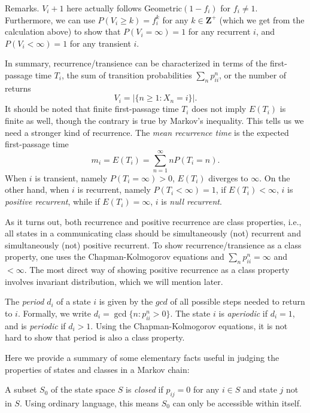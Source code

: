 \documentclass[11pt]{article}
\newcommand{\Z}{\mathbf{Z}}
\newcommand{\abs}[1]{\lvert #1 \rvert}
\begin{document}
\noindent Remarks. $V_{i}+1$ here actually follows Geometric$(1- f_{i})$ for $f_{i}\neq 1$. Furthermore, we can use $P(V_{i}\geq k)=f_{i}^{k}$ for any $k\in \Z^+$ (which we get from the calculation above) to show that $P(V_{i}=\infty )=1$ for any recurrent $i$, and $P(V_{i}<\infty )=1$ for any transient $i$.

In summary, recurrence/transience can be characterized in terms of the first-passage time $T_{i}$, the sum of transition probabilities $\sum_{n}p_{ii}^{n}$, or the number of returns 
\[
V_{i}=\abs{\{n\geq 1:X_{n}=i\}}.
\]
It should be noted that finite first-passage time $T_{i}$ does not imply $E(T_{i})$ is finite as well, though the contrary is true by Markov’s inequality. This tells us we need a stronger kind of recurrence. The \textit{mean recurrence time} is the expected first-passage time
\[
m_{i}=E(T_{i})=\sum_{n=1}^{\infty }nP(T_{i}=n).
\]
When $i$ is transient, namely $P(T_{i}=\infty )>0$, $E(T_{i})$ diverges to $\infty $. On the other hand, when $i$ is recurrent, namely $P(T_{i}<\infty )=1$, if $E(T_{i})<\infty $, $i$ is \textit{positive recurrent}, while if $E(T_{i})=\infty $, $i$ is \textit{null recurrent}.

As it turns out, both recurrence and positive recurrence are class properties, i.e., all states in a communicating class should be simultaneously (not) recurrent and simultaneously (not) positive recurrent. To show recurrence/transience as a class property, one uses the Chapman-Kolmogorov equations and $\sum_{n}p_{ii}^{n}=\infty $ and $<\infty $. The most direct way of showing positive recurrence as a class property involves invariant distribution, which we will mention later.

The \textit{period} $d_{i}$ of a state $i$ is given by the $gcd$ of all possible steps needed to return to $i$. Formally, we write $d_{i}=\gcd\{n:p_{ii}^{n}>0\}$. The state $i$ is \textit{aperiodic} if $d_{i}=1$, and is \textit{periodic} if $d_{i}>1$. Using the Chapman-Kolmogorov equations, it is not hard to show that period is also a class property.

Here we provide a summary of some elementary facts useful in judging the properties of states and classes in a Markov chain:

A subset $S_{0}$ of the state space $S$ is \textit{closed} if $p_{ij}=0$ for any $i\in S$ and state $j$ not in $S$. Using ordinary language, this means $S_{0}$ can only be accessible within itself.
\end{document}
